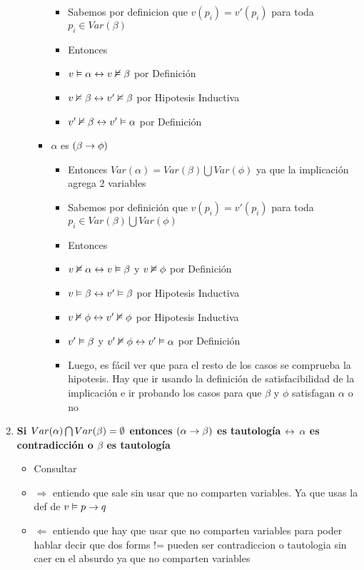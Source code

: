 \documentclass[14pt,a4paper,fleqn]{article}
\begin{document}
\begin{enumerate}
\begin{itemize}
\begin{itemize}
\begin{itemize}
				\item Sabemos por definicion que $v(p_i) = v'(p_i) $ para toda $p_i \in Var(\beta)$
				\item Entonces 
				\item $v \vDash \alpha \leftrightarrow v \nvDash \beta $ por Definición
				\item $v \nvDash \beta \leftrightarrow v' \nvDash \beta $ por Hipotesis Inductiva
				\item $v' \nvDash \beta \leftrightarrow v' \vDash \alpha$ por Definición
			\end{itemize}
			\item $\alpha$ es $(\beta \rightarrow \phi)$
			\begin{itemize}
				\item Entonces $Var(\alpha) = Var(\beta) \bigcup Var(\phi)$ ya que la implicación agrega 2 variables
				\item Sabemos por definición que $v(p_i) = v'(p_i) $ para toda $p_i \in Var(\beta) \bigcup Var(\phi)$
				\item Entonces 
				\item $v \nvDash \alpha \leftrightarrow v \vDash \beta $ y $v \nvDash \phi$ por Definición
				\item $v \vDash \beta \leftrightarrow v' \vDash \beta $ por Hipotesis Inductiva
				\item $v \nvDash \phi \leftrightarrow v' \nvDash \phi $ por Hipotesis Inductiva
				\item $v' \vDash \beta $ y $v' \nvDash \phi \leftrightarrow v' \vDash \alpha$ por Definición
				\item Luego, es fácil ver que para el resto de los casos se comprueba la hipotesis. Hay que ir usando la definición de satisfacibilidad de la implicación e ir probando los casos para que $\beta$ y $\phi$ satisfagan $\alpha$ o no
			\end{itemize}
		\end{itemize}
	\end{itemize}	
	\newpage
	\item \textbf{Si $Var(\alpha) \bigcap Var(\beta) = \emptyset$ entonces $(\alpha \rightarrow \beta)$ es tautología $\leftrightarrow $ $\alpha$ es contradicción o $\beta$ es tautología}
	\begin{itemize}
		\item Consultar
		\item $\Rightarrow$ entiendo que sale sin usar que no comparten variables. Ya que usas la def de $v \vDash p \rightarrow q$
		\item $\Leftarrow$ entiendo que hay que usar que no comparten variables para poder hablar decir que dos forms != pueden ser contradiccion o tautologia sin caer en el absurdo ya que no comparten variables

\end{itemize}
\end{enumerate}
\end{document}
